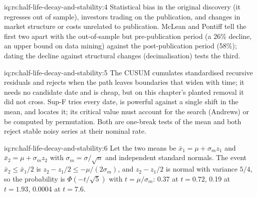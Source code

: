 \begin{solution}{iq:rs:half-life-decay-and-stability:4}
Statistical bias in the original discovery (it regresses out of sample), investors trading on the publication, and changes in market structure
or costs unrelated to publication. McLean and Pontiff tell the first two apart with the out-of-sample but pre-publication period (a 26\% decline,
an upper bound on data mining) against the post-publication period (58\%); dating the decline against structural changes (decimalisation) tests the
third.
\end{solution}

\begin{solution}{iq:rs:half-life-decay-and-stability:5}
The CUSUM cumulates standardised recursive residuals and rejects when the path leaves boundaries that widen with time; it needs no candidate date
and is cheap, but on this chapter's planted removal it did not cross. Sup-F tries every date, is powerful against a single shift in the mean, and
locates it; its critical value must account for the search (Andrews) or be computed by permutation. Both are one-break tests of the mean and
both reject stable noisy series at their nominal rate.
\end{solution}

\begin{solution}{iq:rs:half-life-decay-and-stability:6}
Let the two means be $\bar x_1 = \mu + \sigma_m z_1$ and $\bar x_2 = \mu + \sigma_m z_2$ with $\sigma_m = \sigma/\sqrt n$ and independent standard
normals. The event $\bar x_2 \le \bar x_1/2$ is $z_2 - z_1/2 \le -\mu/(2\sigma_m)$, and $z_2 - z_1/2$ is normal with variance $5/4$, so the probability is
$\Phi(-t/\sqrt5)$ with $t = \mu/\sigma_m$: 0.37 at $t = 0.72$, 0.19 at $t = 1.93$, 0.0004 at $t = 7.6$.
\end{solution}
